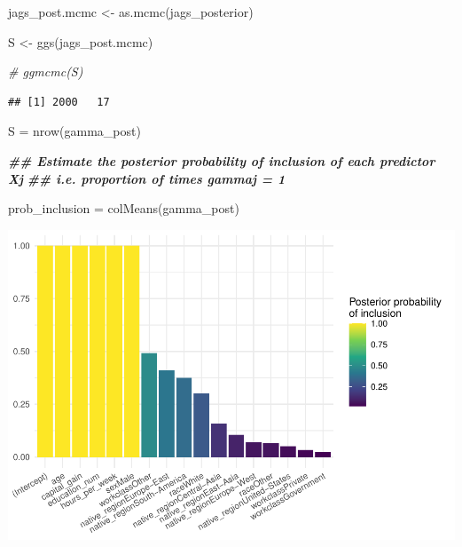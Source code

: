 \documentclass[
]{article}
\newenvironment{Shaded}{\begin{snugshade}}{\end{snugshade}}
\newcommand{\CommentTok}[1]{\textcolor[rgb]{0.56,0.35,0.01}{\textit{#1}}}
\newcommand{\DocumentationTok}[1]{\textcolor[rgb]{0.56,0.35,0.01}{\textbf{\textit{#1}}}}
\newcommand{\FunctionTok}[1]{\textcolor[rgb]{0.00,0.00,0.00}{#1}}
\newcommand{\NormalTok}[1]{#1}
\newcommand{\OtherTok}[1]{\textcolor[rgb]{0.56,0.35,0.01}{#1}}
\newcommand{\SpecialCharTok}[1]{\textcolor[rgb]{0.00,0.00,0.00}{#1}}
\begin{document}
\begin{Shaded}
\begin{Highlighting}[]
\NormalTok{jags\_post.mcmc }\OtherTok{\textless{}{-}} \FunctionTok{as.mcmc}\NormalTok{(jags\_posterior)}

\NormalTok{S }\OtherTok{\textless{}{-}} \FunctionTok{ggs}\NormalTok{(jags\_post.mcmc)}


\CommentTok{\# ggmcmc(S)}
\end{Highlighting}
\end{Shaded}

\begin{Shaded}
\end{Shaded}

\begin{verbatim}
## [1] 2000   17
\end{verbatim}

\begin{Shaded}
\begin{Highlighting}[]
\NormalTok{S }\OtherTok{=} \FunctionTok{nrow}\NormalTok{(gamma\_post)}

\DocumentationTok{\#\# Estimate the posterior probability of inclusion of each predictor Xj}
\DocumentationTok{\#\# i.e. proportion of times gammaj = 1}

\NormalTok{prob\_inclusion }\OtherTok{=} \FunctionTok{colMeans}\NormalTok{(gamma\_post)}
\end{Highlighting}
\end{Shaded}

\includegraphics{bmp_main_files/figure-latex/unnamed-chunk-6-1.pdf}
\end{document}
